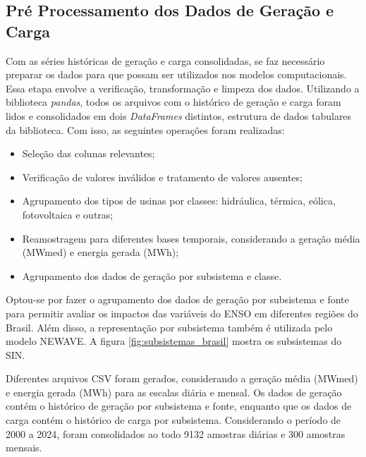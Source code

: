 \subsection{Pré Processamento dos Dados de Geração e Carga} %
Com as séries históricas de geração e carga consolidadas, se faz necessário preparar os dados para que possam ser utilizados 
nos modelos computacionais. Essa etapa envolve a verificação, transformação e limpeza dos dados. Utilizando a biblioteca
\textit{pandas}, todos os arquivos com o histórico de geração e carga foram lidos e consolidados em dois \textit{DataFrames} 
distintos, estrutura de dados tabulares da biblioteca. Com isso, as seguintes operações foram realizadas:
\begin{itemize}
    \item Seleção das colunas relevantes;
    \item Verificação de valores inválidos e tratamento de valores ausentes;
    \item Agrupamento dos tipos de usinas por classes: hidráulica, térmica, eólica, fotovoltaica e outras;
    \item Reamostragem para diferentes bases temporais, considerando a geração média (MWmed) e energia gerada (MWh);
    \item Agrupamento dos dados de geração por subsistema e classe.
\end{itemize}

\begin{figure}[!ht]
	{}
	{}
\end{figure}

Optou-se por fazer o agrupamento dos dados de geração por subsistema e fonte para permitir avaliar os impactos das variáveis
do ENSO em diferentes regiões do Brasil. Além disso, a representação por subsistema também é utilizada pelo modelo NEWAVE. 
A figura \ref{fig:subsistemas_brasil} mostra os subsistemas do SIN.

Diferentes arquivos CSV foram gerados, considerando a geração média (MWmed) e energia gerada (MWh) para as escalas diária e mensal.
Os dados de geração contém o histórico de geração por subsistema e fonte, enquanto que os dados de carga contém o histórico de carga
por subsistema. Considerando o período de 2000 a 2024, foram consolidados ao todo 9132 amostras diárias e 300 amostras mensais.


